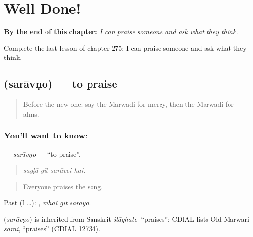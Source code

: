 
\chapter{Well Done!}
\label{ch:mw-well-done}

\begin{chapteropening}
\textbf{By the end of this chapter:} \emph{I can praise someone and ask what they think.}

Complete the last lesson of chapter 275: I can praise someone and ask what they think.
\end{chapteropening}

\section[\texorpdfstring{\mw{सरावणो} (sarāvṇo)}{सरावणो (sarāvṇo)}]{ (sarāvṇo) — to praise}

\label{lesson:MW-C275-saravno}



\begin{quote}
Before the new one: say the Marwadi for mercy, then the Marwadi for alms.
\end{quote}

\subsection*{You'll want to know: }
\textbf{} — \emph{sarāvṇo} — \textquotedblleft{}to praise\textquotedblright{}.

\begin{quote}
   
\end{quote}

\begin{quote}
\emph{sagḷā gīt sarāvai hai.}
\end{quote}

\begin{quote}
Everyone praises the song.
\end{quote}

Past (I …):   , \emph{mhaĩ gīt sarāyo}.

\begin{cousinweb}
\textbf{} (\emph{sarāvṇo}) is inherited from Sanskrit \emph{ślāghate}, \textquotedblleft{}praises\textquotedblright{}; CDIAL lists Old Marwari \emph{sarāi}, \textquotedblleft{}praises\textquotedblright{} (CDIAL 12734).
\end{cousinweb}

